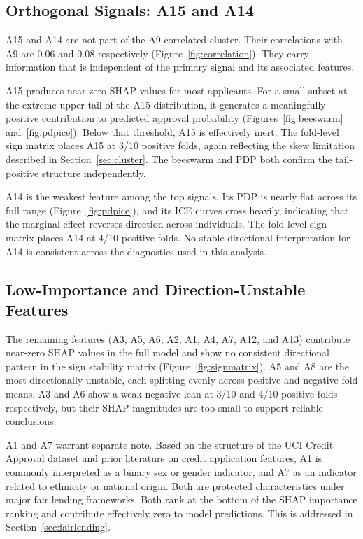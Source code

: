 \documentclass[11pt]{article}
\begin{document}
\subsection{Orthogonal Signals: A15 and A14}

A15 and A14 are not part of the A9 correlated cluster. Their correlations with A9 are 0.06 and 0.08 respectively (Figure~\ref{fig:correlation}). They carry information that is independent of the primary signal and its associated features.

A15 produces near-zero SHAP values for most applicants. For a small subset at the extreme upper tail of the A15 distribution, it generates a meaningfully positive contribution to predicted approval probability (Figures~\ref{fig:beeswarm} and~\ref{fig:pdpice}). Below that threshold, A15 is effectively inert. The fold-level sign matrix places A15 at 3/10 positive folds, again reflecting the skew limitation described in Section~\ref{sec:cluster}. The beeswarm and PDP both confirm the tail-positive structure independently.

A14 is the weakest feature among the top signals. Its PDP is nearly flat across its full range (Figure~\ref{fig:pdpice}), and its ICE curves cross heavily, indicating that the marginal effect reverses direction across individuals. The fold-level sign matrix places A14 at 4/10 positive folds. No stable directional interpretation for A14 is consistent across the diagnostics used in this analysis.


\subsection{Low-Importance and Direction-Unstable Features}

The remaining features (A3, A5, A6, A2, A1, A4, A7, A12, and A13) contribute near-zero SHAP values in the full model and show no consistent directional pattern in the sign stability matrix (Figure~\ref{fig:signmatrix}). A5 and A8 are the most directionally unstable, each splitting evenly across positive and negative fold means. A3 and A6 show a weak negative lean at 3/10 and 4/10 positive folds respectively, but their SHAP magnitudes are too small to support reliable conclusions.

A1 and A7 warrant separate note. Based on the structure of the UCI Credit Approval dataset and prior literature on credit application features, A1 is commonly interpreted as a binary sex or gender indicator, and A7 as an indicator related to ethnicity or national origin. Both are protected characteristics under major fair lending frameworks. Both rank at the bottom of the SHAP importance ranking and contribute effectively zero to model predictions. This is addressed in Section~\ref{sec:fairlending}.
\end{document}
